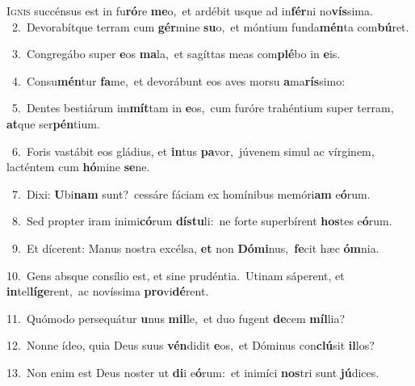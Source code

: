 \lettrine{\initial\textcolor{\initialcolor}{I}}{gnis} succénsus est in fu\-\textbf{ró}\-re \textbf{me}\-o,~\star et ardébit usque ad in\-\textbf{fér}\-ni no\-\textbf{vís}\-sima.\\
{\numbfont\textcolor{\numbcolor}{~2.}}~Devorabítque terram cum \textbf{gér}\-mine \textbf{su}\-o,~\star et móntium funda\-\textbf{mén}\-ta com\-\textbf{bú}\-ret.\par
{\numbfont\textcolor{\numbcolor}{~3.}}~Congregábo super \textbf{e}\-os \textbf{ma}\-la,~\star et sagíttas meas com\-\textbf{plé}\-bo in \textbf{e}\-is.\par
{\numbfont\textcolor{\numbcolor}{~4.}}~Consu\-\textbf{mén}\-tur \textbf{fa}\-me,~\star et devorábunt eos aves morsu \textbf{a}\-ma\-\textbf{rís}\-simo:\par
{\numbfont\textcolor{\numbcolor}{~5.}}~Dentes bestiárum im\-\textbf{mít}\-tam in \textbf{e}\-os,~\star cum furóre trahéntium super terram, \textbf{at}\-que ser\-\textbf{pén}\-tium.\par
{\numbfont\textcolor{\numbcolor}{~6.}}~Foris vastábit eos gládius, et \textbf{in}\-tus \textbf{pa}\-vor,~\star júvenem simul ac vírginem, lacténtem cum \textbf{hó}\-mine \textbf{se}\-ne.\par
{\numbfont\textcolor{\numbcolor}{~7.}}~Dixi: \textbf{U}\-bi\textbf{nam} sunt?~\star cessáre fáciam ex homínibus memóri\textbf{am} e\-\textbf{ó}\-rum.\par
{\numbfont\textcolor{\numbcolor}{~8.}}~Sed propter iram inimi\-\textbf{có}\-rum \textbf{dís}\-\textbf{tu}li:~\star ne forte superbírent \textbf{hos}\-tes e\-\textbf{ó}\-rum.\par
{\numbfont\textcolor{\numbcolor}{~9.}}~Et dícerent: Manus nostra excélsa, \textbf{et} non \textbf{Dó}\-\textbf{mi}nus,~\star \textbf{fe}\-cit hæc \textbf{óm}\-nia.\par
{\numbfont\textcolor{\numbcolor}{10.}}~Gens absque consílio est, et sine prudéntia.~\dagger Utinam sáperent, et \textbf{in}\-tel\-\textbf{lí}\-\textbf{ge}rent,~\star ac novíssima \textbf{pro}\-vi\-\textbf{dé}\-rent.\par
{\numbfont\textcolor{\numbcolor}{11.}}~Quómodo persequátur \textbf{u}\-nus \textbf{mil}\-le,~\star et duo fugent \textbf{de}\-cem \textbf{míl}\-lia?\par
{\numbfont\textcolor{\numbcolor}{12.}}~Nonne ídeo, quia Deus suus \textbf{vén}\-didit \textbf{e}\-os,~\star et Dóminus con\-\textbf{clú}\-sit \textbf{il}\-los?\par
{\numbfont\textcolor{\numbcolor}{13.}}~Non enim est Deus noster ut \textbf{di}\-i e\-\textbf{ó}\-rum:~\star et inimíci \textbf{nos}\-tri sunt \textbf{jú}\-dices.\par
